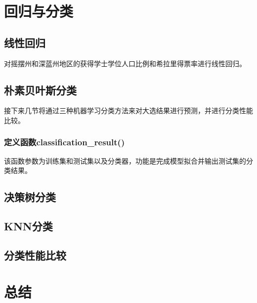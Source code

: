 \documentclass[
12pt, %
UTF8
]{fphw}
\begin{document}
\section{回归与分类}
	\subsection{线性回归}
	对摇摆州和深蓝州地区的获得学士学位人口比例和希拉里得票率进行线性回归。
	\subsection{朴素贝叶斯分类}
	接下来几节将通过三种机器学习分类方法来对大选结果进行预测，并进行分类性能比较。
		\subsubsection{定义函数classification\_result()}
		该函数参数为训练集和测试集以及分类器，功能是完成模型拟合并输出测试集的分类结果。
	\subsection{决策树分类}
	\subsection{KNN分类}
	\subsection{分类性能比较}
	
\section{总结}


\end{document}
